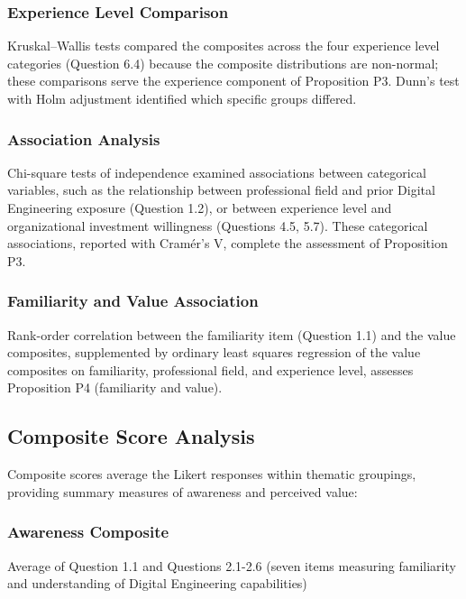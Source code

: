 \subsubsection{Experience Level Comparison}

Kruskal--Wallis tests compared the composites across the four experience level categories (Question 6.4) because the composite distributions are non-normal; these comparisons serve the experience component of Proposition P3. Dunn's test with Holm adjustment identified which specific groups differed.

\subsubsection{Association Analysis}

Chi-square tests of independence examined associations between categorical variables, such as the relationship between professional field and prior Digital Engineering exposure (Question 1.2), or between experience level and organizational investment willingness (Questions 4.5, 5.7). These categorical associations, reported with Cram\'er's V, complete the assessment of Proposition P3.

\subsubsection{Familiarity and Value Association}

Rank-order correlation between the familiarity item (Question 1.1) and the value composites, supplemented by ordinary least squares regression of the value composites on familiarity, professional field, and experience level, assesses Proposition P4 (familiarity and value).

\subsection{Composite Score Analysis}

Composite scores average the Likert responses within thematic groupings, providing summary measures of awareness and perceived value:

\subsubsection{Awareness Composite}

Average of Question 1.1 and Questions 2.1-2.6 (seven items measuring familiarity and understanding of Digital Engineering capabilities)

